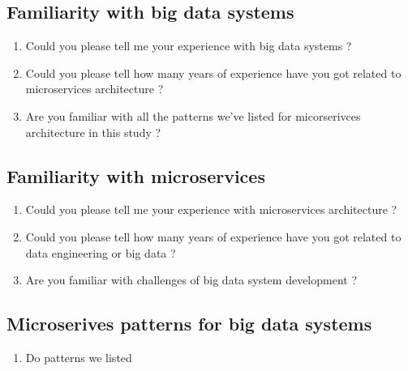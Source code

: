 \documentclass[conference]{IEEEtran}
\begin{document}
\subsection{\textbf{Familiarity with big data systems}}

\begin{enumerate}\begin{enumerate}
    \item Could you please tell me your experience with microservices architecture ? 
    \item Could you please tell how many years of experience have you got related to data engineering or big data ?
    \item Are you familiar with challenges of big data system development ?
\end{enumerate}
    \item Could you please tell me your experience with big data systems ? 
    \item Could you please tell how many years of experience have you got related to microservices architecture ?
    \item Are you familiar with all the patterns we've listed for micorserivces architecture in this study ? 
\end{enumerate}


\subsection{\textbf{Familiarity with microservices}}

\begin{enumerate}
    \item Could you please tell me your experience with microservices architecture ? 
    \item Could you please tell how many years of experience have you got related to data engineering or big data ?
    \item Are you familiar with challenges of big data system development ?
\end{enumerate}


\subsection{\textbf{Microserives patterns for big data systems}}

\begin{enumerate}
    \item Do patterns we listed 
\end{enumerate}
\end{document}
